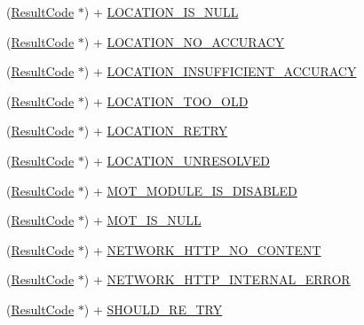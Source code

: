 \begin{DoxyCompactItemize}
(\hyperlink{interface_result_code}{Result\+Code} $\ast$) + \hyperlink{interface_result_code_a9f9967d44893b5ded9d388c74fedc3d6}{L\+O\+C\+A\+T\+I\+O\+N\+\_\+\+I\+S\+\_\+\+N\+U\+L\+L}
\item 
(\hyperlink{interface_result_code}{Result\+Code} $\ast$) + \hyperlink{interface_result_code_abc37df4c01878f2e217cb2ec6e623603}{L\+O\+C\+A\+T\+I\+O\+N\+\_\+\+N\+O\+\_\+\+A\+C\+C\+U\+R\+A\+C\+Y}
\item 
(\hyperlink{interface_result_code}{Result\+Code} $\ast$) + \hyperlink{interface_result_code_acb291dfa4078f1cff925a31435a556ca}{L\+O\+C\+A\+T\+I\+O\+N\+\_\+\+I\+N\+S\+U\+F\+F\+I\+C\+I\+E\+N\+T\+\_\+\+A\+C\+C\+U\+R\+A\+C\+Y}
\item 
(\hyperlink{interface_result_code}{Result\+Code} $\ast$) + \hyperlink{interface_result_code_a509009a50ea821e93d9fef1ed6620d80}{L\+O\+C\+A\+T\+I\+O\+N\+\_\+\+T\+O\+O\+\_\+\+O\+L\+D}
\item 
(\hyperlink{interface_result_code}{Result\+Code} $\ast$) + \hyperlink{interface_result_code_abc189b176f68270b812d426bfd6877bb}{L\+O\+C\+A\+T\+I\+O\+N\+\_\+\+R\+E\+T\+R\+Y}
\item 
(\hyperlink{interface_result_code}{Result\+Code} $\ast$) + \hyperlink{interface_result_code_a31f8610a96c90aa7caaebba8bf340942}{L\+O\+C\+A\+T\+I\+O\+N\+\_\+\+U\+N\+R\+E\+S\+O\+L\+V\+E\+D}
\item 
(\hyperlink{interface_result_code}{Result\+Code} $\ast$) + \hyperlink{interface_result_code_a1b7783312fea73b939388f9cb5068a0c}{M\+O\+T\+\_\+\+M\+O\+D\+U\+L\+E\+\_\+\+I\+S\+\_\+\+D\+I\+S\+A\+B\+L\+E\+D}
\item 
(\hyperlink{interface_result_code}{Result\+Code} $\ast$) + \hyperlink{interface_result_code_a975374e2b752c4f919420d91c146d656}{M\+O\+T\+\_\+\+I\+S\+\_\+\+N\+U\+L\+L}
\item 
(\hyperlink{interface_result_code}{Result\+Code} $\ast$) + \hyperlink{interface_result_code_ae1de5e1f3096bce33c9525843b114f2d}{N\+E\+T\+W\+O\+R\+K\+\_\+\+H\+T\+T\+P\+\_\+\+N\+O\+\_\+\+C\+O\+N\+T\+E\+N\+T}
\item 
(\hyperlink{interface_result_code}{Result\+Code} $\ast$) + \hyperlink{interface_result_code_ac3c2a88186f503d41c20bfd1b12b483a}{N\+E\+T\+W\+O\+R\+K\+\_\+\+H\+T\+T\+P\+\_\+\+I\+N\+T\+E\+R\+N\+A\+L\+\_\+\+E\+R\+R\+O\+R}
\item 
(\hyperlink{interface_result_code}{Result\+Code} $\ast$) + \hyperlink{interface_result_code_a050b711d012d42b93a7e5627588f55d5}{S\+H\+O\+U\+L\+D\+\_\+\+R\+E\+\_\+\+T\+R\+Y}
\item 

\end{DoxyCompactItemize}

